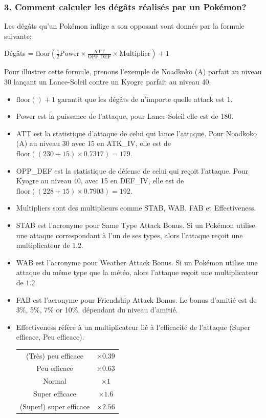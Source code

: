 \documentclass[12pt]{beamer}
\begin{document}
\begin{frame}
\frametitle{3. Comment calculer les dégâts réalisés par un Pokémon?}

\begin{block}{}
\begin{footnotesize}
Les dégâts qu'un Pokémon inflige a son opposant sont donnés par la formule suivante:
\begin{center}
Dégâts = $\text{floor}\left(\frac{1}{2}\text{Power} \times \frac{\text{ATT}}{\text{OPP\_DEF}}\times\text{Multiplier}\right) +1$
\end{center}

Pour illustrer cette formule, prenons l'exemple de Noadkoko (A) parfait au niveau 30 lançant un Lance-Soleil contre un Kyogre parfait au niveau 40.
\begin{itemize}
  \item $\text{floor}\left(\right)+1$ garantit que les dégâts de n'importe quelle attack est 1.
  \item Power est la puissance de l'attaque, pour Lance-Soleil elle est de 180.
  \item ATT est la statistique d'attaque de celui qui lance l'attaque. Pour Noadkoko (A) au niveau 30 avec 15 en ATK\_IV, elle est de $\text{floor}((230+15)\times0.7317) = 179$.
  \item OPP\_DEF est la statistique de défense de celui qui reçoit l'attaque. Pour Kyogre au niveau 40, avec 15 en DEF\_IV, elle est de $\text{floor}((228+15)\times0.7903) = 192$.
  \item Multipliers sont des multiplieurs comme  STAB, WAB, FAB et Effectiveness.
  \item STAB est l'acronyme pour Same Type Attack Bonus. Si un Pok\'emon utilise une attaque correspondant à l'un de ses types, alors l'attaque reçoit une multiplicateur de $1.2$.
  \item WAB est l'acronyme pour Weather Attack Bonus. Si un Pok\'emon utilise une attaque du même type que la météo, alors l'attaque reçoit une multiplicateur de $1.2$.
  \item FAB est l'acronyme pour Friendship Attack Bonus. Le bonus d'amitié est de 3\%, 5\%, 7\% or 10\%, dépendant du niveau d'amitié.
  \item Effectiveness réfère à un multiplicateur lié à l'efficacité de l'attaque (Super efficace, Peu efficace).

\begin{center}
\begin{tabular}{cc}
(Très) peu efficace & $\times 0.39$ \\
Peu efficace & $\times 0.63$ \\
Normal & $\times 1$ \\
Super efficace & $\times 1.6$  \\ 
(Super!) super efficace & $\times 2.56$ \\
\end{tabular} 
\end{center}
\end{itemize}


\end{footnotesize}
\end{block}
\end{frame}
\end{document}
